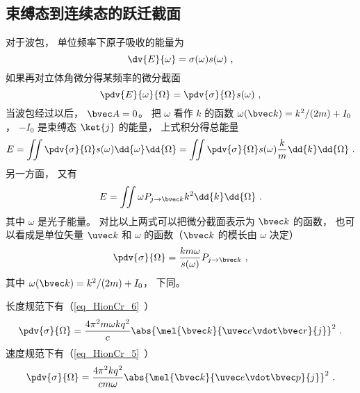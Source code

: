 \subsection{束缚态到连续态的跃迁截面}
对于波包， 单位频率下原子吸收的能量为
\begin{equation}
\dv{E}{\omega} = \sigma(\omega) s(\omega)~,
\end{equation}
如果再对立体角微分得某频率的微分截面 %
\begin{equation}
\pdv{E}{\omega}{\Omega} = \pdv{\sigma}{\Omega} s(\omega)~,
\end{equation}
当波包经过以后， $\bvec A = 0$。 把 $\omega$ 看作 $k$ 的函数 $\omega(\bvec k) = k^2/(2m) + I_0$， $-I_0$ 是束缚态 $\ket{j}$ 的能量， 上式积分得总能量
\begin{equation}
E = \iint \pdv{\sigma}{\Omega} s(\omega) \dd{\omega}\dd{\Omega} = \iint \pdv{\sigma}{\Omega} s(\omega) \frac{k}{m}\dd{k}\dd{\Omega}~.
\end{equation}
另一方面， 又有
\begin{equation}
E = \iint \omega P_{j\to {\bvec k}} k^2 \dd{k}\dd{\Omega}~.
\end{equation}
其中 $\omega$ 是光子能量。 对比以上两式可以把微分截面表示为 $\bvec k$ 的函数， 也可以看成是单位矢量 $\uvec k$ 和 $\omega$ 的函数（$\bvec k$ 的模长由 $\omega$ 决定）
\begin{equation}
\pdv{\sigma}{\Omega} = \frac{km \omega}{s(\omega)} P_{j\to \bvec k}~,
\end{equation}
其中 $\omega(\bvec k) = k^2/(2m) + I_0$， 下同。

长度规范下有（\autoref{eq_HionCr_6}~）
\begin{equation}
\pdv{\sigma}{\Omega} = \frac{4\pi^2 m\omega k q^2}{c} \abs{\mel{\bvec k}{\uvec e \vdot\bvec r}{j}}^2~.
\end{equation}
速度规范下有（\autoref{eq_HionCr_5}~）
\begin{equation}\label{eq_SIcros_8} %
\pdv{\sigma}{\Omega} = \frac{4\pi^2 k q^2}{c m \omega} \abs{\mel{\bvec k}{\uvec e \vdot \bvec p}{j}}^2~.
\end{equation}
